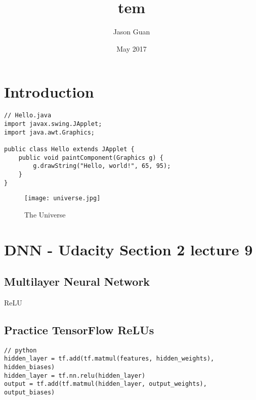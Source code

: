 \documentclass{article}
\title{tem}
\author{Jason Guan }
\date{May 2017}
\begin{document}
\maketitle

\section{Introduction}

\begin{lstlisting}
// Hello.java
import javax.swing.JApplet;
import java.awt.Graphics;

public class Hello extends JApplet {
    public void paintComponent(Graphics g) {
        g.drawString("Hello, world!", 65, 95);
    }
}
\end{lstlisting}

\begin{figure}[h!]
\centering
\texttt{[image: universe.jpg]}
\caption{The Universe}
\label{fig:univerise}
\end{figure}

\section{DNN - Udacity Section 2 lecture 9}
\subsection{Multilayer Neural Network}
ReLU
\subsection{Practice TensorFlow ReLUs}

\begin{lstlisting}
// python
hidden_layer = tf.add(tf.matmul(features, hidden_weights), hidden_biases)
hidden_layer = tf.nn.relu(hidden_layer)
output = tf.add(tf.matmul(hidden_layer, output_weights), output_biases)
\end{lstlisting}
\end{document}
